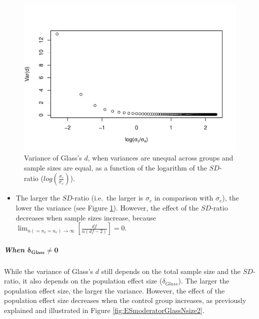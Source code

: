 \documentclass[
  english,
  man,mask]{apa6}
\providecommand{\tightlist}{%
  \setlength{\itemsep}{0pt}\setlength{\parskip}{0pt}}
\let\oldsubparagraph\subparagraph
\renewcommand{\subparagraph}[1]{\oldsubparagraph{#1}\mbox{}}
\begin{document}
\begin{figure}
\centering
\includegraphics{Theoretical-Bias-of-all-estimators-as-a-function-of-population-parameters_files/figure-latex/varglasshetbalSDratio2-1.pdf}
\caption{\label{fig:varglasshetbalSDratio2}Variance of Glass's \(d\), when variances are unequal across groups and sample sizes are equal, as a function of the logarithm of the \(SD\)-ratio (\(log \left( \frac{\sigma_c}{\sigma_e} \right)\)).}
\end{figure}

\begin{itemize}
\tightlist
\item
  The larger the \(SD\)-ratio (i.e.~the larger is \(\sigma_c\) in comparison with \(\sigma_e\)), the lower the variance (see Figure \ref{fig:varglasshetbalSDratio2}). However, the effect of the \(SD\)-ratio decreases when sample sizes increase, because \(\lim_{n(=n_c=n_e)\rightarrow \infty}\left[\frac{df}{n(df-2)} \right]=0\).
\end{itemize}

\hypertarget{when-bmdelta_glass-neq-0-1}{%
\subparagraph{\texorpdfstring{When \(\bm{\delta_{Glass} \neq 0}\)}{When \textbackslash bm\{\textbackslash delta\_\{Glass\} \textbackslash neq 0\}}}\label{when-bmdelta_glass-neq-0-1}}

While the variance of Glass's \(d\) still depends on the total sample size and the \(SD\)-ratio, it also depends on the population effect size (\(\delta_{Glass}\)). The larger the population effect size, the larger the variance. However, the effect of the population effect size decreases when the control group increases, as previously explained and illustrated in Figure \ref{fig:ESmoderatorGlassNsize2}.
\end{document}
